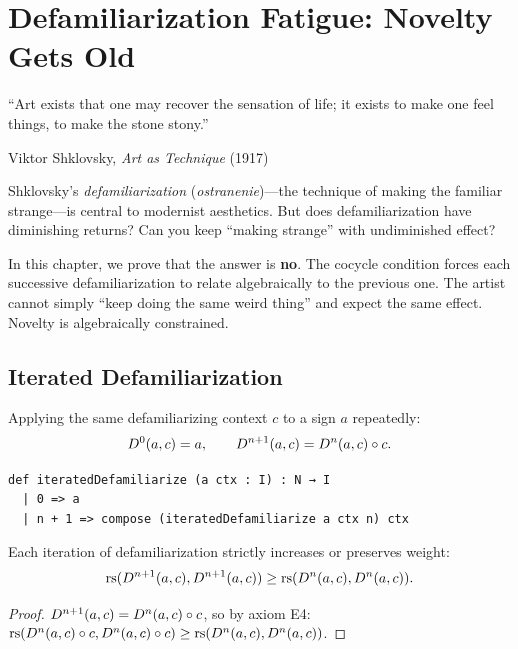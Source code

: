 
\chapter{Defamiliarization Fatigue: Novelty Gets Old}
\label{ch:defamiliarization}

\epigraph{``Art exists that one may recover the sensation of life;
it exists to make one feel things, to make the stone stony.''}{Viktor Shklovsky, \textit{Art as Technique} (1917)}

Shklovsky's \emph{defamiliarization} (\textit{ostranenie})---the technique
of making the familiar strange---is central to modernist aesthetics.
But does defamiliarization have diminishing returns?  Can you keep
``making strange'' with undiminished effect?

In this chapter, we prove that the answer is \textbf{no}.  The cocycle
condition forces each successive defamiliarization to relate
algebraically to the previous one.  The artist cannot simply ``keep doing
the same weird thing'' and expect the same effect.  Novelty is
algebraically constrained.

\section{Iterated Defamiliarization}

\begin{definition}
Applying the same defamiliarizing context $c$ to a sign $a$
repeatedly:
\[
  D^0(a, c) = a, \qquad D^{n+1}(a, c) = D^n(a, c) \circ c.
\]
\end{definition}

\begin{lstlisting}
def iteratedDefamiliarize (a ctx : I) : N → I
  | 0 => a
  | n + 1 => compose (iteratedDefamiliarize a ctx n) ctx
\end{lstlisting}

\begin{theorem}
\label{thm:weight-mono}
Each iteration of defamiliarization strictly increases or preserves weight:
\[
  \mathrm{rs}(D^{n+1}(a,c), D^{n+1}(a,c)) \geq \mathrm{rs}(D^n(a,c), D^n(a,c)).
\]
\end{theorem}

\begin{proof}
$D^{n+1}(a,c) = D^n(a,c) \circ c$, so by axiom E4:
$\mathrm{rs}(D^n(a,c) \circ c, D^n(a,c) \circ c) \geq \mathrm{rs}(D^n(a,c), D^n(a,c))$.
\end{proof}


